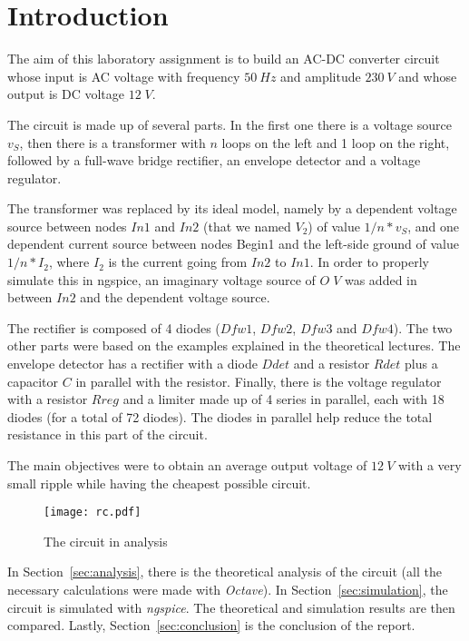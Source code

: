\section{Introduction}
\label {sec:introduction}


The aim of this laboratory assignment is to build an AC-DC converter circuit whose input is AC voltage with frequency $50 \ Hz$ and amplitude $230 \ V$ and whose output is DC voltage $12 \; V$.


The circuit is made up of several parts. In the first one there is a voltage source $v_S$, then there is a transformer with $n$ loops on the left and 1 loop on the right, followed by a full-wave bridge rectifier, an envelope detector and a voltage regulator.

The transformer was replaced by its ideal model, namely by a dependent voltage source between nodes $In1$ and $In2$ (that we named $V_2$) of value $1/n * v_S$,  and one dependent current source between nodes Begin1 and the left-side ground of value $1/n * I_2$, where $I_2$ is the current going from $In2$ to $In1$. In order to properly simulate this in ngspice, an imaginary voltage source of $O\;V$ was added in between $In2$ and the dependent voltage source.

The rectifier is composed of 4 diodes ($Dfw1$, $Dfw2$, $Dfw3$ and $Dfw4$). The two other parts were based on the examples explained in the theoretical lectures. The envelope detector has a rectifier with a diode $Ddet$ and a resistor $Rdet$ plus a capacitor $C$ in parallel with the resistor. Finally, there is the voltage regulator with a resistor $Rreg$ and a limiter made up of 4 series in parallel, each with 18 diodes (for a total of 72 diodes). The diodes in parallel help reduce the total resistance in this part of the circuit.


The main objectives were to obtain an average output voltage of $12 \ V$ with a very small ripple while having the cheapest possible circuit.

\begin{figure}[H] \centering
\texttt{[image: rc.pdf]}
\caption{The circuit in analysis}
\label{fig:circuit}
\end{figure}


In Section~\ref{sec:analysis}, there is the theoretical analysis of the circuit (all the necessary calculations were made with \textit{Octave}). In Section~\ref{sec:simulation}, the circuit is simulated with \textit{ngspice}. The theoretical and simulation results are then compared. Lastly,  Section~\ref{sec:conclusion} is the conclusion of the report. 
